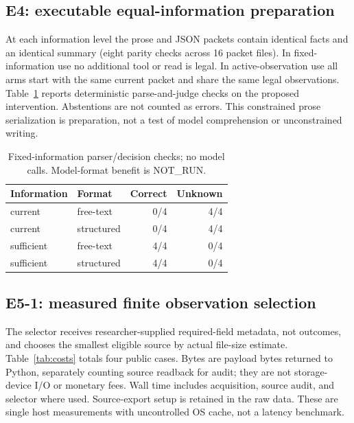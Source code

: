 \subsection{E4: executable equal-information preparation}
At each information level the prose and JSON packets contain identical facts and an identical summary (eight parity checks across 16 packet files). In fixed-information use no additional tool or read is legal. In active-observation use all arms start with the same current packet and share the same legal observations. Table~\ref{tab:packets} reports deterministic parse-and-judge checks on the proposed intervention. Abstentions are not counted as errors. This constrained prose serialization is preparation, not a test of model comprehension or unconstrained writing.

\begin{table}[ht]
\centering
\begin{tabular}{llrr}
\toprule
Information & Format & Correct & Unknown \\
\midrule
current & free-text & 0/4 & 4/4 \\
current & structured & 0/4 & 4/4 \\
sufficient & free-text & 4/4 & 0/4 \\
sufficient & structured & 4/4 & 0/4 \\
\bottomrule
\end{tabular}
\caption{Fixed-information parser/decision checks; no model calls. Model-format benefit is NOT\_RUN.}
\label{tab:packets}
\end{table}

\subsection{E5-1: measured finite observation selection}
The selector receives researcher-supplied required-field metadata, not outcomes, and chooses the smallest eligible source by actual file-size estimate. Table~\ref{tab:costs} totals four public cases. Bytes are payload bytes returned to Python, separately counting source readback for audit; they are not storage-device I/O or monetary fees. Wall time includes acquisition, source audit, and selector where used. Source-export setup is retained in the raw data. These are single host measurements with uncontrolled OS cache, not a latency benchmark.

